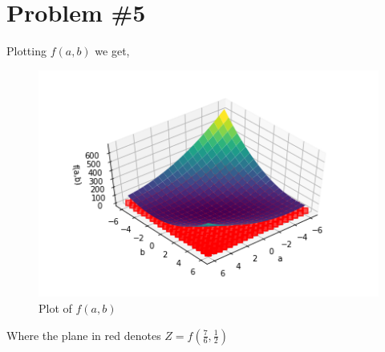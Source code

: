 \documentclass{article}
\begin{document}
\section*{Problem \#5}

Plotting $f(a,b)$ we get,
\begin{figure}[H]
    \centering
    \includegraphics[scale=0.8]{Thatgraph (1).png}
    \caption{Plot of $f(a,b)$}
    \label{fig:my_label}
\end{figure}

Where the plane in red denotes $Z = f\left(\frac{7}{6}, \frac{1}{2}\right)$
\end{document}
